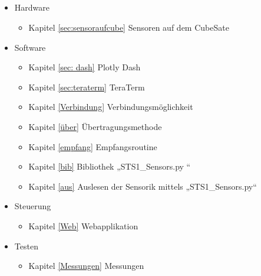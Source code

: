 \subsection{\nameCZ}
\begin{itemize}
	\item Hardware
	\begin{itemize}
		\item Kapitel \ref{sec:sensoraufcube} Sensoren auf dem CubeSate 
	\end{itemize}
	\item Software
	\begin{itemize}
		\item Kapitel \ref{sec: dash} Plotly Dash
		\item Kapitel \ref{sec:teraterm} TeraTerm
		
		\item Kapitel \ref{Verbindung} Verbindungsmöglichkeit 
		\item Kapitel \ref{über} Übertragungsmethode 
		\item Kapitel \ref{empfang} Empfangsroutine
		\item Kapitel \ref{bib} Bibliothek „STS1\_Sensors.py “ 
		\item Kapitel \ref{aus} Auslesen der Sensorik mittels „STS1\_Sensors.py“
		
	\end{itemize}
	\item Steuerung
	\begin{itemize}
		\item Kapitel \ref{Web} Webapplikation 
	\end{itemize}
	\item Testen
	\begin{itemize}
		\item Kapitel \ref{Messungen} Messungen
	\end{itemize}
\end{itemize}
\newpage

